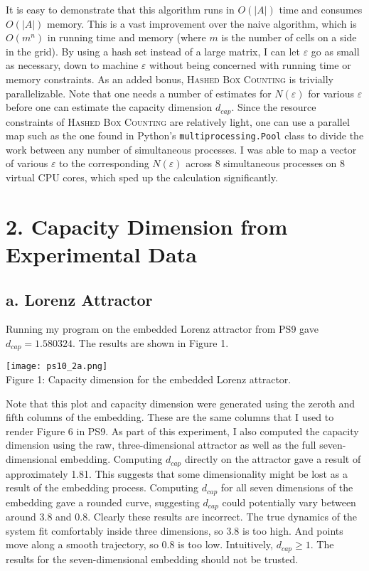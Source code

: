 \documentclass[12pt, letterpaper]{article}
\begin{document}
It is easy to demonstrate that this algorithm runs in $O(|A|)$ time and consumes
$O(|A|)$ memory. This is a vast improvement over the naive algorithm, which is
$O(m^n)$ in running time and memory (where $m$ is the number of cells on a side
in the grid). By using a hash set instead of a large matrix, I can let $\varepsilon$
go as small as necessary, down to machine $\varepsilon$ without being concerned 
with running time or memory constraints. As an added bonus, \textsc{Hashed Box 
Counting} is trivially parallelizable. Note that one needs a number of estimates 
for $N(\varepsilon)$ for various $\varepsilon$ before one can estimate the 
capacity dimension $d_{cap}$. Since the resource constraints of \textsc{Hashed 
Box Counting} are relatively light, one can use a parallel map such as the one
found in Python's \texttt{multiprocessing.Pool} class to divide the work between
any number of simultaneous processes. I was able to map a vector of various
$\varepsilon$ to the corresponding $N(\varepsilon)$ across 8 simultaneous 
processes on 8 virtual CPU cores, which sped up the calculation significantly.

\section*{2. Capacity Dimension from Experimental Data}
\subsection*{a. Lorenz Attractor}

Running my program on the embedded Lorenz attractor from PS9 gave 
$d_{cap} = 1.580324$. The results are shown in Figure 1.

\begin{center}
\texttt{[image: ps10\_2a.png]}
\\
Figure 1: Capacity dimension for the embedded Lorenz attractor.
\end{center}

Note that this plot and capacity dimension were generated using the zeroth and 
fifth columns of the embedding. These are the same columns that I used to render 
Figure 6 in PS9. As part of this experiment, I also computed the capacity 
dimension using the raw, three-dimensional attractor as well as the full
seven-dimensional embedding. Computing $d_{cap}$ directly on the attractor gave
a result of approximately 1.81. This suggests that some dimensionality might be
lost as a result of the embedding process. Computing $d_{cap}$ for all seven
dimensions of the embedding gave a rounded curve, suggesting $d_{cap}$ could
potentially vary between around 3.8 and 0.8. Clearly these results are incorrect.
The true dynamics of the system fit comfortably inside three dimensions, so 3.8
is too high. And points move along a smooth trajectory, so 0.8 is too low. 
Intuitively, $d_{cap} \geq 1$. The results for the seven-dimensional embedding
should not be trusted.
\end{document}
